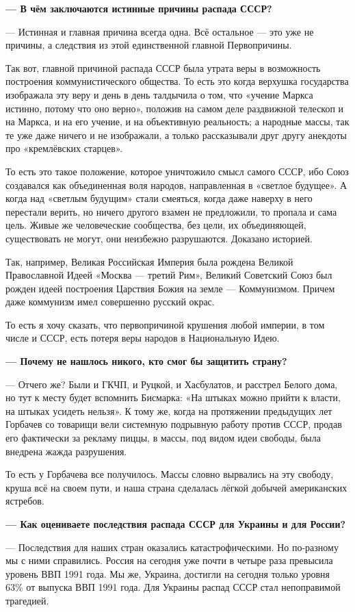 \textbf{— В чём заключаются истинные причины распада СССР?}

— Истинная и главная причина всегда одна. Всё остальное — это уже не причины, а
следствия из этой единственной главной Первопричины.

Так вот, главной причиной распада СССР была утрата веры в возможность
построения коммунистического общества. То есть это когда верхушка государства
изображала эту веру и день в день талдычила о том, что «учение Маркса истинно,
потому что оно верно», положив на самом деле раздвижной телескоп и на Маркса, и
на его учение, и на объективную реальность; а народные массы, так те уже даже
ничего и не изображали, а только рассказывали друг другу анекдоты про
«кремлёвских старцев».

То есть это такое положение, которое уничтожило смысл самого СССР, ибо Союз
создавался как объединенная воля народов, направленная в «светлое будущее». А
когда над «светлым будущим» стали смеяться, когда даже наверху в него перестали
верить, но ничего другого взамен не предложили, то пропала и сама цель. Живые
же человеческие сообщества, без цели, их объединяющей, существовать не могут,
они неизбежно разрушаются. Доказано историей.

Так, например, Великая Российская Империя была рождена Великой Православной
Идеей «Москва — третий Рим», Великий Советский Союз был рожден идеей построения
Царствия Божия на земле — Коммунизмом. Причем даже коммунизм имел совершенно
русский окрас.

То есть я хочу сказать, что первопричиной крушения любой империи, в том числе и
СССР, есть потеря веры народов в Национальную Идею.

\textbf{— Почему не нашлось никого, кто смог бы защитить страну?}

— Отчего же? Были и ГКЧП, и Руцкой, и Хасбулатов, и расстрел Белого дома, но
тут к месту будет вспомнить Бисмарка: «На штыках можно прийти к власти, на
штыках усидеть нельзя». К тому же, когда на протяжении предыдущих лет Горбачев
со товарищи вели системную подрывную работу против СССР, продав его фактически
за рекламу пиццы, в массы, под видом идеи свободы, была внедрена жажда
разрушения.

То есть у Горбачева все получилось. Массы словно вырвались на эту свободу,
круша всё на своем пути, и наша страна сделалась лёгкой добычей американских
ястребов.

\textbf{— Как оцениваете последствия распада СССР для Украины и для России?}

— Последствия для наших стран оказались катастрофическими. Но по-разному мы с
ними справились. Россия на сегодня уже почти в четыре раза превысила уровень
ВВП 1991 года. Мы же, Украина, достигли на сегодня только уровня 63\% от выпуска
ВВП 1991 года. Для Украины распад СССР стал непоправимой трагедией.

